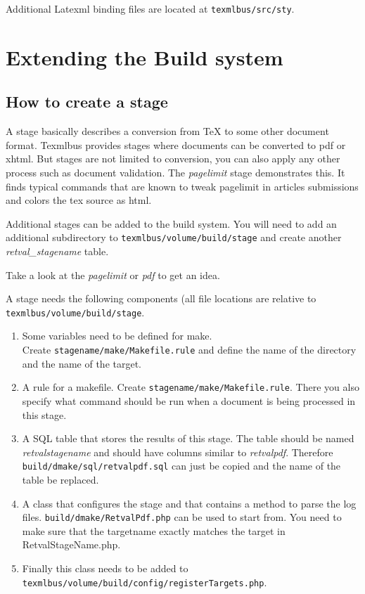 \documentclass[a4paper]{article}
\begin{document}
Additional Latexml binding files are located at \texttt{texmlbus/src/sty}.

\section{Extending the Build system}

\subsection{How to create a stage}

A stage basically describes a conversion from \TeX{} to some other document format. 
Texmlbus provides stages where documents can be converted to pdf or xhtml.  But stages are not limited to conversion, you can also apply any other process such as  document validation. The \textsl{pagelimit} stage demonstrates this. It finds typical commands that are known to tweak pagelimit in articles submissions and colors the tex source as html.

Additional stages can be added to the build system. You will need to add an additional subdirectory to \texttt{texmlbus/volume/build/stage} and create another \textsl{retval\_stagename} table.

Take a look at the \textsl{pagelimit} or \textsl{pdf} to get an idea.

A stage needs the following components (all file locations are relative to \texttt{texmlbus/volume/build/stage}.

\begin{enumerate}
\item Some variables need to be defined for make.\\
Create \texttt{stagename/make/Makefile.rule} and define the name of the directory and the name of the target.

\item A rule for a makefile. Create \texttt{stagename/make/Makefile.rule}. There you also specify what command should be run when a document is being processed in this stage.

\item A SQL table that stores the results of this stage. The table should be named \textsl{retval\textunderscore{}stagename} and should have columns similar to \textsl{retval\textunderscore{}pdf}.  Therefore \texttt{build/dmake/sql/retval\textunderscore{}pdf.sql} can just be copied and the name of the table be replaced.

\item A class that configures the stage and that contains a method to parse the log files.  \texttt{build/dmake/RetvalPdf.php} can be used to start from. You need to make sure that the targetname exactly matches the target in RetvalStageName.php.

\item Finally this class needs to be added to\\ 
\texttt{texmlbus/volume/build/config/registerTargets.php}.
\end{enumerate}
\end{document}
